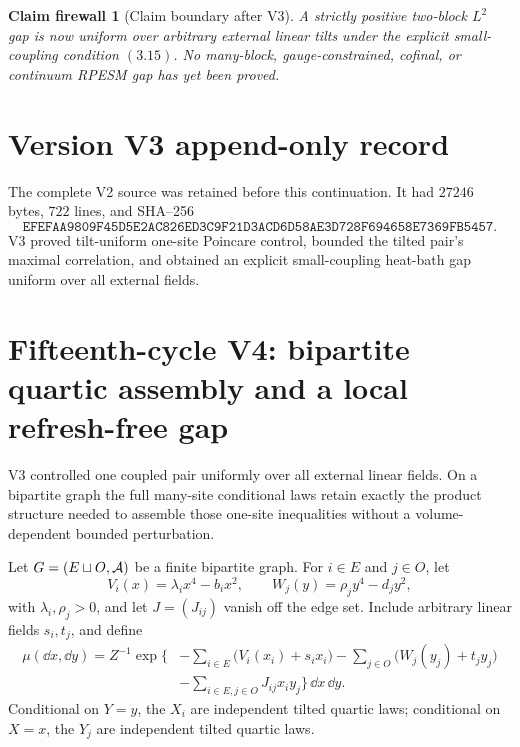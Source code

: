 \documentclass[11pt]{article}
\newtheorem{firewall}[theorem]{Claim firewall}
\theoremstyle{remark}
\begin{document}
\begin{firewall}[Claim boundary after V3]
\label{fire:v15v3}
A strictly positive two-block \(L^2\) gap is now uniform over
arbitrary external linear tilts under the explicit small-coupling
condition \((3.15)\).  No many-block, gauge-constrained, cofinal,
or continuum RPESM gap has yet been proved.
\end{firewall}

\section*{Version V3 append-only record}
The complete V2 source was retained before this continuation.  It
had \(27246\) bytes, \(722\) lines, and SHA--256
\[
 \texttt{EFEFAA9809F45D5E2AC826ED3C9F21D3ACD6D58AE3D728F694658E7369FB5457}.
\]
V3 proved tilt-uniform one-site Poincare control, bounded the
tilted pair's maximal correlation, and obtained an explicit
small-coupling heat-bath gap uniform over all external fields.


\section{Fifteenth-cycle V4: bipartite quartic assembly and a local refresh-free gap}
\label{sec:v15v4}

V3 controlled one coupled pair uniformly over all external linear
fields.  On a bipartite graph the full many-site conditional laws
retain exactly the product structure needed to assemble those
one-site inequalities without a volume-dependent bounded
perturbation.

Let \(G=(E\sqcup O,{\cal A})\) be a finite bipartite graph.  For
\(i\in E\) and \(j\in O\), let
\[
 V_i(x)=\lambda_ix^4-b_ix^2,\qquad
 W_j(y)=\rho_jy^4-d_jy^2,                                   \tag{4.1}
\]
with \(\lambda_i,\rho_j>0\), and let \(J=(J_{ij})\) vanish off
the edge set.  Include arbitrary linear fields \(s_i,t_j\), and
define
\[
 \begin{split}
 \mu(\dd x,\dd y)=Z^{-1}\exp\biggl\{&
 -\sum_{i\in E}\bigl(V_i(x_i)+s_ix_i\bigr)
 -\sum_{j\in O}\bigl(W_j(y_j)+t_jy_j\bigr)\\
 &-\sum_{i\in E,j\in O}J_{ij}x_iy_j
 \biggr\}\,\dd x\,\dd y.                                    \tag{4.2}
 \end{split}
\]
Conditional on \(Y=y\), the \(X_i\) are independent tilted
quartic laws; conditional on \(X=x\), the \(Y_j\) are independent
tilted quartic laws.
\end{document}
